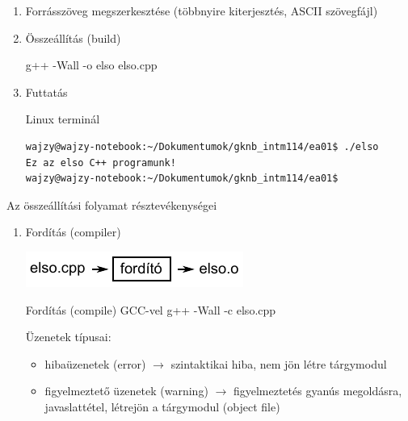 \documentclass[usenames,dvipsnames,aspectratio=169]{beamer}
\begin{document}
\begin{frame}
  \begin{enumerate}
      \item Forrásszöveg megszerkesztése (többnyire  kiterjesztés, ASCII szövegfájl)
    \end{enumerate}
    \begin{exampleblock}{}
      \footnotesize
      
    \end{exampleblock}
\end{frame}

\begin{frame}[fragile]
  \begin{enumerate}
    \setcounter{enumi}{1}
    \item Összeállítás (build)
      \begin{block}{}
        g++ -Wall -o elso elso.cpp
      \end{block}
    \item Futtatás
    \begin{block}{Linux terminál}
      \scriptsize
      \begin{verbatim}
wajzy@wajzy-notebook:~/Dokumentumok/gknb_intm114/ea01$ ./elso 
Ez az elso C++ programunk!
wajzy@wajzy-notebook:~/Dokumentumok/gknb_intm114/ea01$
\end{verbatim}
    \end{block}
  \end{enumerate}
\end{frame}

\begin{frame}
  Az összeállítási folyamat résztevékenységei
  \begin{enumerate}
    \item Fordítás (compiler)
    \begin{center}
      \includegraphics{forditas.pdf}
    \end{center}
    \begin{block}{Fordítás (compile) GCC-vel}
      g++ -Wall -c elso.cpp
    \end{block}
    Üzenetek típusai:
    \begin{itemize}
      \item hibaüzenetek (error) $\rightarrow$ szintaktikai hiba, nem jön létre tárgymodul
      \item figyelmeztető üzenetek (warning) $\rightarrow$ figyelmeztetés gyanús megoldásra, javaslattétel, létrejön a 
tárgymodul (object file)
    \end{itemize}
  \end{enumerate}
\end{frame}
\end{document}
